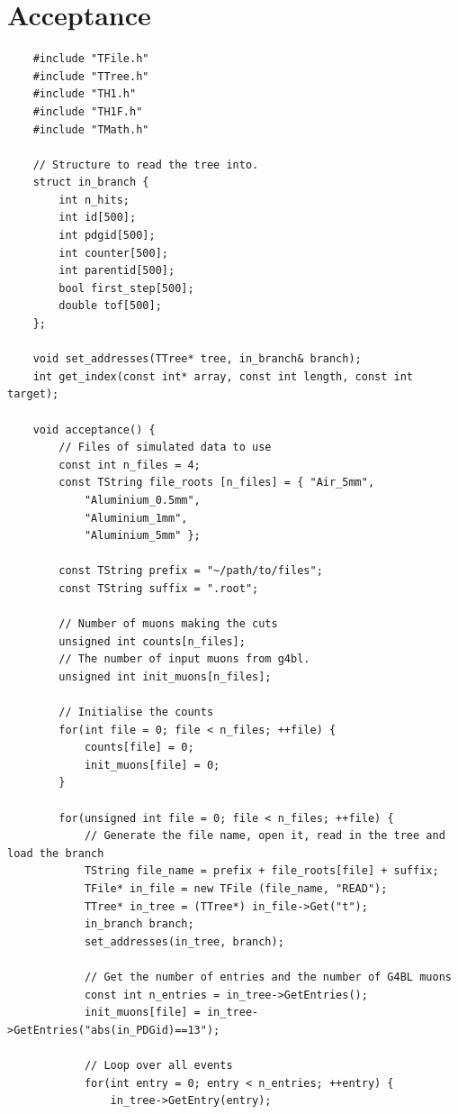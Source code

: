 \documentclass[]{article}
\begin{document}
\section{Acceptance} %
\label{app:acceptance}
\begin{verbatim}
    #include "TFile.h"
    #include "TTree.h"
    #include "TH1.h"
    #include "TH1F.h"
    #include "TMath.h"

    // Structure to read the tree into.
    struct in_branch {
        int n_hits;
        int id[500];
        int pdgid[500];
        int counter[500];
        int parentid[500];
        bool first_step[500];
        double tof[500];
    };

    void set_addresses(TTree* tree, in_branch& branch);
    int get_index(const int* array, const int length, const int target);

    void acceptance() {
        // Files of simulated data to use
        const int n_files = 4;
        const TString file_roots [n_files] = { "Air_5mm",
            "Aluminium_0.5mm",
            "Aluminium_1mm",
            "Aluminium_5mm" };

        const TString prefix = "~/path/to/files";
        const TString suffix = ".root";
        
        // Number of muons making the cuts
        unsigned int counts[n_files];     
        // The number of input muons from g4bl.
        unsigned int init_muons[n_files]; 

        // Initialise the counts
        for(int file = 0; file < n_files; ++file) {
            counts[file] = 0;
            init_muons[file] = 0;
        }

        for(unsigned int file = 0; file < n_files; ++file) {
            // Generate the file name, open it, read in the tree and load the branch
            TString file_name = prefix + file_roots[file] + suffix;
            TFile* in_file = new TFile (file_name, "READ");
            TTree* in_tree = (TTree*) in_file->Get("t");
            in_branch branch; 
            set_addresses(in_tree, branch);
            
            // Get the number of entries and the number of G4BL muons
            const int n_entries = in_tree->GetEntries();
            init_muons[file] = in_tree->GetEntries("abs(in_PDGid)==13");
            
            // Loop over all events
            for(int entry = 0; entry < n_entries; ++entry) {
                in_tree->GetEntry(entry);
                

\end{verbatim}
\end{document}
